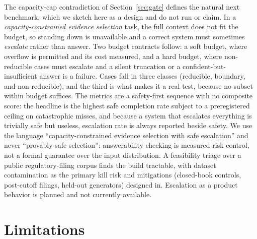\documentclass[11pt]{article}
\begin{document}
The capacity-cap contradiction of Section~\ref{sec:gate} defines the natural next benchmark, which
we sketch here as a design and do not run or claim. In a \emph{capacity-constrained evidence
selection} task, the full context does not fit the budget, so standing down is unavailable and a
correct system must sometimes \emph{escalate} rather than answer. Two budget contracts follow: a
soft budget, where overflow is permitted and its cost measured, and a hard budget, where
non-reducible cases must escalate and a silent truncation or a confident-but-insufficient answer is
a failure. Cases fall in three classes (reducible, boundary, and non-reducible), and the third
is what makes it a real test, because no subset within budget suffices. The metrics are a
safety-first sequence with no composite score: the headline is the highest safe completion rate
subject to a preregistered ceiling on catastrophic misses, and because a system that escalates
everything is trivially safe but useless, escalation rate is always reported beside safety. We use
the language ``capacity-constrained evidence selection with safe escalation'' and never ``provably
safe selection'': answerability checking is measured risk control, not a formal guarantee over the
input distribution. A feasibility triage over a public regulatory-filing corpus finds the build
tractable, with dataset contamination as the primary kill risk and mitigations (closed-book
controls, post-cutoff filings, held-out generators) designed in. Escalation as a product behavior
is planned and not currently available.

\section{Limitations}
\label{sec:limitations}
\end{document}
